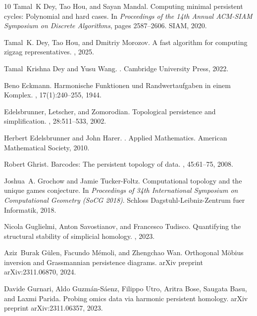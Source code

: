 \begin{thebibliography}{10}
Tamal~K Dey, Tao Hou, and Sayan Mandal.
\newblock Computing minimal persistent cycles: Polynomial and hard cases.
\newblock In {\em Proceedings of the 14th Annual {ACM-SIAM} Symposium on
  Discrete Algorithms}, pages 2587--2606. SIAM, 2020.

Tamal~K. Dey, Tao Hou, and Dmitriy Morozov.
\newblock A fast algorithm for computing zigzag representatives.
, 2025.

Tamal~Krishna Dey and Yusu Wang.
.
\newblock Cambridge University Press, 2022.

Beno Eckmann.
\newblock Harmonische {F}unktionen und {R}andwertaufgaben in einem {K}omplex.
, 17(1):240--255, 1944.

Edelsbrunner, Letscher, and Zomorodian.
\newblock Topological persistence and simplification.
, 28:511--533, 2002.

Herbert Edelsbrunner and John Harer.
.
\newblock Applied Mathematics. American Mathematical Society, 2010.

Robert Ghrist.
\newblock Barcodes: The persistent topology of data.
, 45:61--75,
  2008.

Joshua~A. Grochow and Jamie Tucker-Foltz.
\newblock Computational topology and the unique games conjecture.
\newblock In {\em Proceedings of 34th International Symposium on Computational
  Geometry (SoCG 2018)}. Schloss Dagstuhl-Leibniz-Zentrum fuer Informatik,
  2018.

Nicola Guglielmi, Anton Savostianov, and Francesco Tudisco.
\newblock Quantifying the structural stability of simplicial homology.
, 2023.

Aziz~Burak G{\"u}len, Facundo M{\'e}moli, and Zhengchao Wan.
\newblock Orthogonal {M}\"obius inversion and {G}rassmannian persistence
  diagrams.
\newblock arXiv preprint arXiv:2311.06870, 2024.

Davide Gurnari, Aldo Guzm{\'a}n-S{\'a}enz, Filippo Utro, Aritra Bose, Saugata
  Basu, and Laxmi Parida.
\newblock Probing omics data via harmonic persistent homology.
\newblock arXiv preprint arXiv:2311.06357, 2023.


\end{thebibliography}
